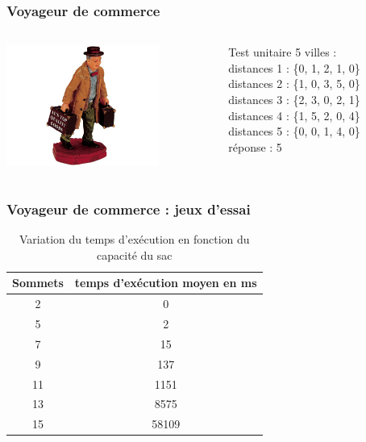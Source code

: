 \documentclass[french]{beamer}
\begin{document}
\begin{frame}
  \frametitle{Voyageur de commerce}
  \begin{columns}
    \begin{column}[]{5cm}
      \begin{center}
        \includegraphics[height=4cm]{salesman2.jpg}
      \end{center}
    \end{column}
      \begin{column}[]{6cm}
        \begin{block}{Test unitaire}
	5 villes : \\
	distances 1 : \{0, 1, 2, 1, 0\} \\
	distances 2 : \{1, 0, 3, 5, 0\} \\
	distances 3 : \{2, 3, 0, 2, 1\} \\
	distances 4 : \{1, 5, 2, 0, 4\} \\
	distances 5 : \{0, 0, 1, 4, 0\} \\
	réponse : 5
        \end{block}
      \end{column}
    \end{columns}
  \end{frame}

\begin{frame}
\frametitle{Voyageur de commerce : jeux d'essai}
\begin{table}[h!]
\centering
\begin{tabular}{|c|c|}
\hline
Sommets & temps d'exécution moyen en ms\\
\hline
2 & 0\\
\hline
5 & 2\\
\hline
7 & 15\\
\hline
9 & 137\\
\hline
11 & 1151\\
\hline
13 & 8575\\
\hline
15 & 58109\\
\hline
\end{tabular}
\caption {Variation du temps d'exécution en fonction du capacité du sac}
\end{table}
\end{frame}
\end{document}

